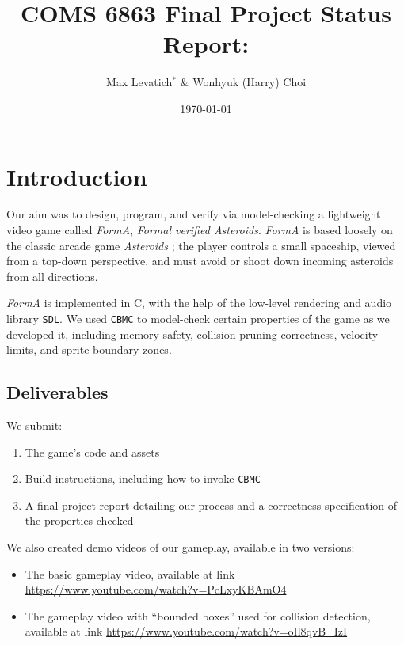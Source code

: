 \documentclass{article}
\title{COMS 6863 Final Project Status Report: \Name{}}
\author{
    Max Levatich$^*$ \& Wonhyuk (Harry) Choi
}
\date{\today}
\newcommand{\Name}{\textit{FormA}\xspace}
\newcommand{\cbmc}{\texttt{CBMC}}
\newcommand{\sdl}{\texttt{SDL}}
\begin{document}
\maketitle

\section{Introduction}

    Our aim was to design, program, and verify via model-checking a lightweight
	video game called \Name{}, \emph{Formal verified Asteroids}.
	\Name is based loosely on the classic arcade game \textit{Asteroids}
    \cite{asteroids}; the player controls a small spaceship, viewed from a
    top-down perspective, and must avoid or shoot down incoming asteroids from
    all directions.

    \Name{} is implemented in C, with the help of the low-level rendering and
    audio library \sdl{}. We used \cbmc{} \cite{clarke2004tool} to model-check
    certain properties of the game as we developed it, including memory safety,
    collision pruning correctness, velocity limits, and sprite boundary zones.

    \subsection{Deliverables}

        We submit:

        \begin{enumerate}
            \item{The game's code and assets}
            \item{Build instructions, including how to invoke \cbmc{}}
            \item{A final project report detailing our process and a correctness
            specification of the properties checked}
        \end{enumerate}

        We also created demo videos of our gameplay, available in two versions:

        \begin{itemize}
            \item The basic gameplay video, available at link \url{
        			https://www.youtube.com/watch?v=PcLxyKBAmO4
            }
            \item The gameplay video with ``bounded boxes'' used for collision detection, available at link \url{
        			https://www.youtube.com/watch?v=oIl8qvB_IzI
            }
        \end{itemize}
\end{document}
